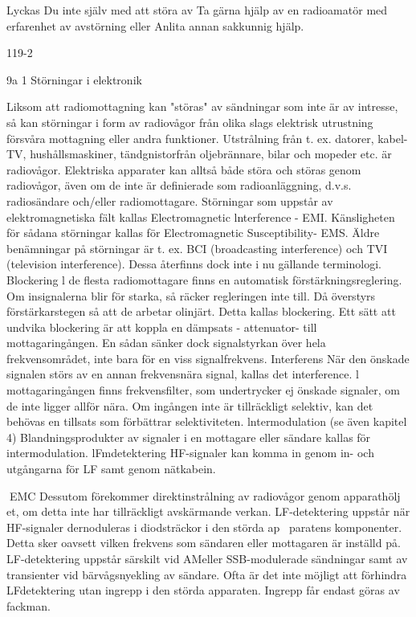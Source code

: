 Lyckas Du inte själv med att störa av
Ta gärna hjälp av en radioamatör med
erfarenhet av avstörning eller
Anlita annan sakkunnig hjälp.

119-2

9a 1 Störningar i elektronik

Liksom att radiomottagning kan "störas" av
sändningar som inte är av intresse, så kan
störningar i form av radiovågor från olika
slags elektrisk utrustning försvåra mottagning eller andra funktioner.
Utstrålning från t. ex. datorer, kabel-TV,
hushållsmaskiner, tändgnistorfrån oljebrännare, bilar och mopeder etc. är radiovågor.
Elektriska apparater kan alltså både störa
och störas genom radiovågor, även om de
inte är definierade som radioanläggning,
d.v.s. radiosändare och/eller radiomottagare.
Störningar som uppstår av elektromagnetiska fält kallas Electromagnetic lnterference - EMI. Känsligheten för sådana störningar kallas för Electromagnetic Susceptibility- EMS.
Äldre benämningar på störningar är t. ex.
BCI (broadcasting interference) och TVI (television interference). Dessa återfinns dock
inte i nu gällande terminologi.
Blockering
l de flesta radiomottagare finns en automatisk förstärkningsreglering. Om insignalerna
blir för starka, så räcker regleringen inte till.
Då överstyrs förstärkarstegen så att de arbetar olinjärt. Detta kallas blockering.
Ett sätt att undvika blockering är att koppla en dämpsats - attenuator- till mottagaringången. En sådan sänker dock signalstyrkan över hela frekvensområdet, inte bara för
en viss signalfrekvens.
Interferens
När den önskade signalen störs av en annan frekvensnära signal, kallas det interference. l mottagaringången finns frekvensfilter, som undertrycker ej önskade signaler,
om de inte ligger allför nära. Om ingången
inte är tillräckligt selektiv, kan det behövas
en tillsats som förbättrar selektiviteten.
lntermodulation (se även kapitel 4)
Blandningsprodukter av signaler i en mottagare eller sändare kallas för intermodulation.
lFmdetektering
HF-signaler kan komma in genom in- och
utgångarna för LF samt genom nätkabein.

EMC
Dessutom förekommer direktinstrålning
av radiovågor genom apparathölj et, om detta
inte har tillräckligt avskärmande verkan.
LF-detektering uppstår när HF-signaler
dernoduleras i diodsträckor i den störda ap~
paratens komponenter. Detta sker oavsett
vilken frekvens som sändaren eller mottagaren är inställd på.
LF-detektering uppstår särskilt vid AMeller SSB-modulerade sändningar samt av
transienter vid bärvågsnyekling av sändare.
Ofta är det inte möjligt att förhindra LFdetektering utan ingrepp i den störda apparaten. Ingrepp får endast göras av fackman.

